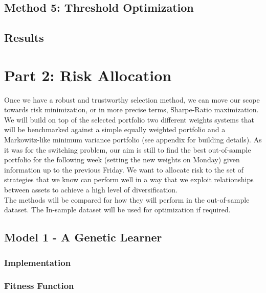 \documentclass[12pt]{article} %
\numberwithin{equation}{subsection}
\begin{document}
\subsection{Method 5: Threshold Optimization}



\subsection{Results}



\newpage

\section{Part 2: Risk Allocation}

Once we have a robust and trustworthy selection method, we can move our scope towards risk minimization, or in more precise terms, Sharpe-Ratio maximization. We will build on top of the selected portfolio two different weights systems that will be benchmarked against a simple equally weighted portfolio and a Markowitz-like minimum variance portfolio (see appendix for building details). As it was for the switching problem, our aim is still to find the best out-of-sample portfolio for the following week (setting the new weights on Monday) given information up to the previous Friday. We want to allocate risk to the set of strategies that we know can perform well in a way that we exploit relationships between assets to achieve a high level of diversification.\\
The methods will be compared for how they will perform in the out-of-sample dataset. The In-sample dataset will be used for optimization if required.\\ 

\subsection{Model 1 - A Genetic Learner}




\subsubsection{Implementation}



\subsubsection{Fitness Function}
\end{document}

